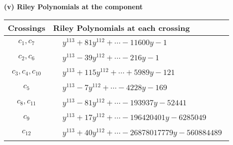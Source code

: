 \documentclass[1p]{elsarticle_modified}
\theoremstyle{definition}
\begin{document}
\flushleft \textbf{(v) Riley Polynomials at the component}\newline \\
\begin{tabular}{m{50pt}|m{274pt}}
Crossings & \hspace{64pt}Riley Polynomials at each crossing \\
\hline $$\begin{aligned}c_{1},c_{7}\end{aligned}$$&$\begin{aligned}
&y^{113}+81 y^{112}+\cdots-11600 y-1
\end{aligned}$\\
\hline $$\begin{aligned}c_{2},c_{6}\end{aligned}$$&$\begin{aligned}
&y^{113}-39 y^{112}+\cdots-216 y-1
\end{aligned}$\\
\hline $$\begin{aligned}c_{3},c_{4},c_{10}\end{aligned}$$&$\begin{aligned}
&y^{113}+115 y^{112}+\cdots+5989 y-121
\end{aligned}$\\
\hline $$\begin{aligned}c_{5}\end{aligned}$$&$\begin{aligned}
&y^{113}-7 y^{112}+\cdots-4228 y-169
\end{aligned}$\\
\hline $$\begin{aligned}c_{8},c_{11}\end{aligned}$$&$\begin{aligned}
&y^{113}-81 y^{112}+\cdots-193937 y-52441
\end{aligned}$\\
\hline $$\begin{aligned}c_{9}\end{aligned}$$&$\begin{aligned}
&y^{113}+17 y^{112}+\cdots-196420401 y-6285049
\end{aligned}$\\
\hline $$\begin{aligned}c_{12}\end{aligned}$$&$\begin{aligned}
&y^{113}+40 y^{112}+\cdots-26878017779 y-560884489
\end{aligned}$\\
\hline
\end{tabular}\\~\\
\end{document}
